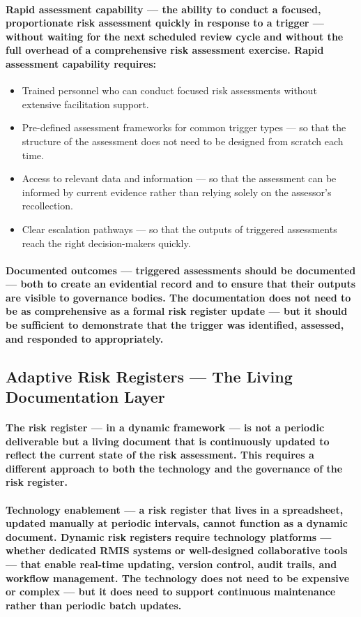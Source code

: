 \paragraph{\textbf{Rapid assessment capability} — the ability to conduct a focused, proportionate risk assessment quickly in response to a trigger — without waiting for the next scheduled review cycle and without the full overhead of a comprehensive risk assessment exercise. Rapid assessment capability requires:}
\begin{itemize}
  \item{Trained personnel who can conduct focused risk assessments without extensive facilitation support.}
  \item{Pre-defined assessment frameworks for common trigger types — so that the structure of the assessment does not need to be designed from scratch each time.}
  \item{Access to relevant data and information — so that the assessment can be informed by current evidence rather than relying solely on the assessor's recollection.}
  \item{Clear escalation pathways — so that the outputs of triggered assessments reach the right decision-makers quickly.}
\end{itemize}
\paragraph{\textbf{Documented outcomes} — triggered assessments should be documented — both to create an evidential record and to ensure that their outputs are visible to governance bodies. The documentation does not need to be as comprehensive as a formal risk register update — but it should be sufficient to demonstrate that the trigger was identified, assessed, and responded to appropriately.}

\subsection{Adaptive Risk Registers — The Living Documentation Layer}
\paragraph{The risk register — in a dynamic framework — is not a periodic deliverable but a living document that is continuously updated to reflect the current state of the risk assessment. This requires a different approach to both the technology and the governance of the risk register.}
\paragraph{\textbf{Technology enablement} — a risk register that lives in a spreadsheet, updated manually at periodic intervals, cannot function as a dynamic document. Dynamic risk registers require technology platforms — whether dedicated RMIS systems or well-designed collaborative tools — that enable real-time updating, version control, audit trails, and workflow management. The technology does not need to be expensive or complex — but it does need to support continuous maintenance rather than periodic batch updates.}
